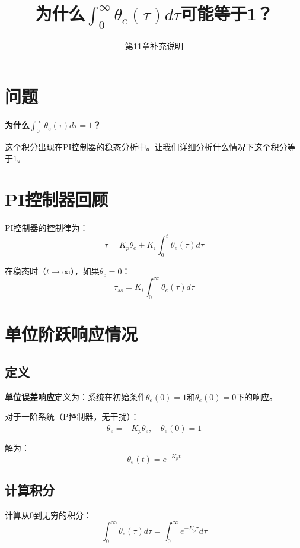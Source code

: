\documentclass[12pt,a4paper]{article}
\title{为什么$\int_0^{\infty} \theta_e(\tau) d\tau$可能等于1？}
\author{第11章补充说明}
\date{}
\begin{document}
\maketitle

\section{问题}

\textbf{为什么$\int_0^{\infty} \theta_e(\tau) d\tau = 1$？}

这个积分出现在PI控制器的稳态分析中。让我们详细分析什么情况下这个积分等于1。

\section{PI控制器回顾}

PI控制器的控制律为：
\begin{equation}
\tau = K_p \theta_e + K_i \int_0^t \theta_e(\tau) d\tau
\end{equation}

在稳态时（$t \to \infty$），如果$\theta_e = 0$：
\begin{equation}
\tau_{ss} = K_i \int_0^{\infty} \theta_e(\tau) d\tau
\end{equation}

\section{单位阶跃响应情况}

\subsection{定义}

\textbf{单位误差响应}定义为：系统在初始条件$\theta_e(0) = 1$和$\dot{\theta}_e(0) = 0$下的响应。

对于一阶系统（P控制器，无干扰）：
\begin{equation}
\dot{\theta}_e = -K_p \theta_e, \quad \theta_e(0) = 1
\end{equation}

解为：
\begin{equation}
\theta_e(t) = e^{-K_p t}
\end{equation}

\subsection{计算积分}

计算从0到无穷的积分：
\begin{equation}
\int_0^{\infty} \theta_e(\tau) d\tau = \int_0^{\infty} e^{-K_p \tau} d\tau
\end{equation}
\end{document}
